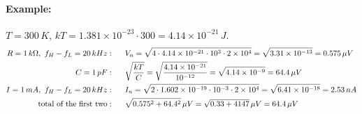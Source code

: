 \paragraph{Example:} \(T = 300\,K\), \(kT = 1.381 \times 10^{-23} \cdot 300 = 4.14 \times 10^{-21}\,J\).
\begin{align*}
  R = 1\,k\Omega,\ f_H - f_L = 20\,kHz &: \hspace{0.5cm} V_n = \sqrt{4 \cdot 4.14 \times 10^{-21} \cdot 10^{3} \cdot 2 \times 10^{4}} = \sqrt{3.31 \times 10^{-13}} = 0.575\,\mu V \\
  C = 1\,pF &: \hspace{0.5cm} \sqrt{\frac{kT}{C}} = \sqrt{\frac{4.14 \times 10^{-21}}{10^{-12}}} = \sqrt{4.14 \times 10^{-9}} = 64.4\,\mu V \\
  I = 1\,mA,\ f_H - f_L = 20\,kHz &: \hspace{0.5cm} I_n = \sqrt{2 \cdot 1.602 \times 10^{-19} \cdot 10^{-3} \cdot 2 \times 10^{4}} = \sqrt{6.41 \times 10^{-18}} = 2.53\,nA \\
  \text{total of the first two} &: \hspace{0.5cm} \sqrt{0.575^2 + 64.4^2}\,\mu V = \sqrt{0.33 + 4147}\,\mu V = 64.4\,\mu V
\end{align*}
